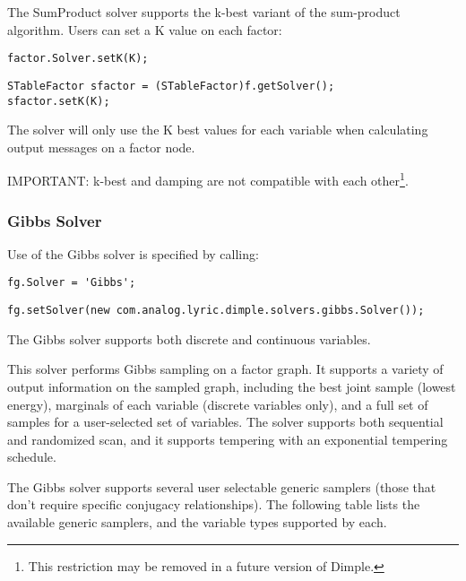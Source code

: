

The SumProduct solver supports the k-best variant of the sum-product algorithm.  Users can set a K value on each factor:

\ifmatlab
\begin{lstlisting}
factor.Solver.setK(K);
\end{lstlisting}
\fi

\ifjava
\begin{lstlisting}
STableFactor sfactor = (STableFactor)f.getSolver();
sfactor.setK(K);
\end{lstlisting}
\fi

The solver will only use the K best values for each variable when calculating output messages on a factor node.

IMPORTANT: k-best and damping are not compatible with each other\footnote{This restriction may be removed in a future version of Dimple.}.


\subsubsection{Gibbs Solver}
\label{sec:GibbsSolverAPI}

Use of the Gibbs solver is specified by calling:

\ifmatlab
\begin{lstlisting}
fg.Solver = 'Gibbs';
\end{lstlisting}
\fi

\ifjava
\begin{lstlisting}
fg.setSolver(new com.analog.lyric.dimple.solvers.gibbs.Solver());
\end{lstlisting}
\fi

The Gibbs solver supports both discrete and continuous variables.

This solver performs Gibbs sampling on a factor graph.  It supports a variety of output information on the sampled graph, including the best joint sample (lowest energy), marginals of each variable (discrete variables only), and a full set of samples for a user-selected set of variables.  The solver supports both sequential and randomized scan, and it supports tempering with an exponential tempering schedule.

The Gibbs solver supports several user selectable generic samplers (those that don't require specific conjugacy relationships).  The following table lists the available generic samplers, and the variable types supported by each.

